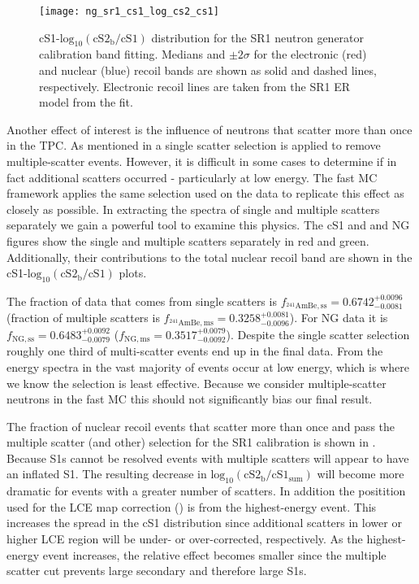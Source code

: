 \begin{figure}
\centering
\texttt{[image: ng\_sr1\_cs1\_log\_cs2\_cs1]}
\caption{cS1-$\mathrm{log}_{10}(\mathrm{cS2_b / cS1})$ distribution for the SR1 neutron generator calibration band fitting.  Medians and
$\pm 2\sigma$ for the electronic (red) and nuclear (blue) recoil bands are shown as solid and dashed lines, respectively.  Electronic
recoil lines are taken from the SR1 ER model from the fit.}
\label{fig:er_nr_calibrations_results_ng_sr1_cs1_log_cs2_cs1}
\end{figure}

Another effect of interest is the influence of neutrons that scatter more than once in the TPC.  As mentioned in
 a single scatter selection is applied to remove multiple-scatter
events.  However,
it is difficult in some cases to determine if in fact additional scatters occurred - particularly at low energy.  The fast MC framework
applies the same selection used on the data to replicate this effect as closely as possible.  In extracting the spectra of single and
multiple scatters separately we gain a powerful tool to examine this physics.  The cS1 and \cstwob \ambe and NG figures show the single
and multiple scatters separately in red and green.  Additionally, their contributions to the total nuclear recoil band are shown in
the cS1-$\mathrm{log}_{10}(\mathrm{cS2_b/cS1})$ plots.

The fraction of \ambe data that comes from single scatters is $f_{\mathrm{^{241}AmBe, ss}} = 0.6742_{-0.0081}^{+0.0096}$
(fraction of multiple scatters is $f_{\mathrm{^{241}AmBe, ms}} = 0.3258_{-0.0096}^{+0.0081}$).  For NG data it is
$f_{\mathrm{NG, ss}} = 0.6483_{-0.0079}^{+0.0092}$ ($f_{\mathrm{NG, ms}} = 0.3517_{-0.0092}^{+0.0079}$).  Despite the single scatter
selection
roughly one third of multi-scatter events end up in the final data.  From the energy spectra in
 the vast majority of events occur at low energy, which is where
we know the selection is least effective.  Because we consider multiple-scatter neutrons in the fast MC this should not significantly
bias our final result.

The fraction of nuclear recoil events that scatter more than once and pass the multiple scatter (and other) selection for the SR1 \ambe
calibration is shown in
.  Because S1s cannot be resolved events with multiple scatters will appear to have an
inflated S1.  The resulting decrease in $\mathrm{log}_{10}(\mathrm{cS2_b / cS1_{sum}})$ will become more dramatic for events with a
greater number of scatters.  In addition the positition used for the LCE map correction
() is from the highest-energy event.  This
increases the spread in the cS1 distribution since additional scatters in lower or higher LCE region will be under- or over-corrected,
respectively.  As the highest-energy event increases, the relative effect becomes smaller since the multiple scatter cut prevents large
secondary \stwob and therefore large S1s.

